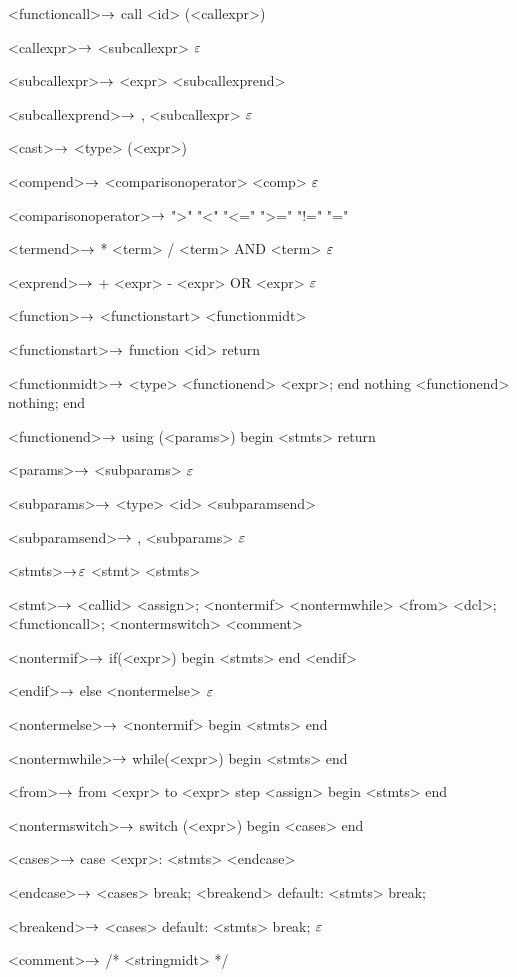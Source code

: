 \begin{grammar}
<functioncall>$\rightarrow$ call <id> (<callexpr>)

<callexpr>$\rightarrow$ <subcallexpr>
\alt$\varepsilon$

<subcallexpr>$\rightarrow$ <expr> <subcallexprend>

<subcallexprend>$\rightarrow$ , <subcallexpr>
\alt$\varepsilon$

<cast>$\rightarrow$ <type> (<expr>)

<compend>$\rightarrow$ <comparisonoperator> <comp>
\alt$\varepsilon$

<comparisonoperator>$\rightarrow$ ">"
				\alt "<"
				\alt "<="
				\alt ">="
				\alt "!="
				\alt "="

<termend>$\rightarrow$ * <term>
\alt / <term>
\alt AND <term>
\alt$\varepsilon$

<exprend>$\rightarrow$ + <expr>
\alt - <expr>
\alt OR <expr>
\alt$\varepsilon$

<function>$\rightarrow$  <functionstart> <functionmidt>

<functionstart>$\rightarrow$ function <id> return

<functionmidt>$\rightarrow$ <type> <functionend> <expr>; end
\alt nothing <functionend> nothing; end

<functionend>$\rightarrow$
using (<params>)
begin
	<stmts>
	return

<params>$\rightarrow$ <subparams>
	\alt$\varepsilon$

<subparams>$\rightarrow$ <type> <id> <subparamsend>

<subparamsend>$\rightarrow$ , <subparams>
\alt$\varepsilon$

<stmts>$\rightarrow$$\varepsilon$
	\alt <stmt> <stmts>

<stmt>$\rightarrow$ <callid> <assign>;
	\alt <nontermif>
	\alt <nontermwhile>
	\alt <from>
	\alt <dcl>;
	\alt <functioncall>;
	\alt <nontermswitch>
	\alt <comment>
	
<nontermif>$\rightarrow$ if(<expr>)
	begin
		<stmts>
	end
	<endif>

<endif>$\rightarrow$ 
	else <nontermelse>
	\alt$\varepsilon$

<nontermelse>$\rightarrow$ <nontermif>
	\alt begin
		<stmts>
	end

<nontermwhile>$\rightarrow$ while(<expr>)
		begin
			<stmts>
		end
		
<from>$\rightarrow$ from <expr> to <expr> step <assign>
	begin
		<stmts>
	end

<nontermswitch>$\rightarrow$ switch (<expr>)
		begin
			<cases>
		end

<cases>$\rightarrow$ case <expr>:
			<stmts>
		<endcase>
		
<endcase>$\rightarrow$ <cases>
		\alt break; <breakend>
		\alt default:
			<stmts>
			break;

<breakend>$\rightarrow$ <cases>
\alt default:
<stmts>
break;
\alt$\varepsilon$

<comment>$\rightarrow$ /* <stringmidt> */


\end{grammar}